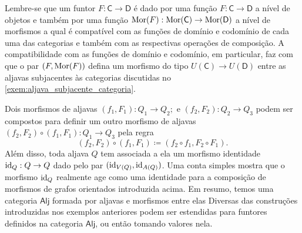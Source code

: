 \begin{exem}\label{exem:funtor_induz_morfismo_de_aljavas}
    Lembre-se que um funtor $F: \mathsf{C} \to \mathsf{D}$ é dado por uma função $F: \mathsf{C} \to \mathsf{D}$ a nível de objetos e também por uma função $\mathrm{Mor}(F): \mathrm{Mor}(\mathsf{C}) \to \mathrm{Mor}(\mathsf{D})$ a nível de morfismos a qual é compatível com as funções de domínio e codomínio de cada uma das categorias e também com as respectivas operações de composição.
    A compatibilidade com as funções de domínio e codomínio, em particular, faz com que o par $(F,\mathrm{Mor}(F))$ defina um morfismo do tipo $U(\mathsf{C}) \to U(\mathsf{D})$ entre as aljavas subjacentes às categorias discutidas no \cref{exem:aljava_subjacente_categoria}.
\end{exem}

Dois morfismos de aljavas $(f_1,F_1): Q_1 \to Q_2;$ e $(f_2,F_2): Q_2 \to Q_3$ podem ser compostos para definir um outro morfismo de aljavas $(f_2,F_2) \circ (f_1,F_1): Q_1 \to Q_3$ pela regra
\begin{displaymath}
    (f_2,F_2) \circ (f_1,F_1) \coloneqq (f_2 \circ f_1,F_2 \circ F_1).
\end{displaymath}
Além disso, toda aljava $Q$ tem associada a ela um morfismo identidade $\mathrm{id}_Q: Q \to Q$ dado pelo par $(\mathrm{id}_{V(Q)},\mathrm{id}_{A(Q)})$.
Uma conta simples mostra que o morfismo $\mathrm{id}_Q$ realmente age como uma identidade para a composição de morfismos de grafos orientados introduzida acima.
Em resumo, temos uma categoria $\mathsf{Alj}$ formada por aljavas e morfismos entre elas
Diversas das construções introduzidas nos exemplos anteriores podem ser estendidas para funtores definidos na categoria $\mathsf{Alj}$, ou então tomando valores nela.

